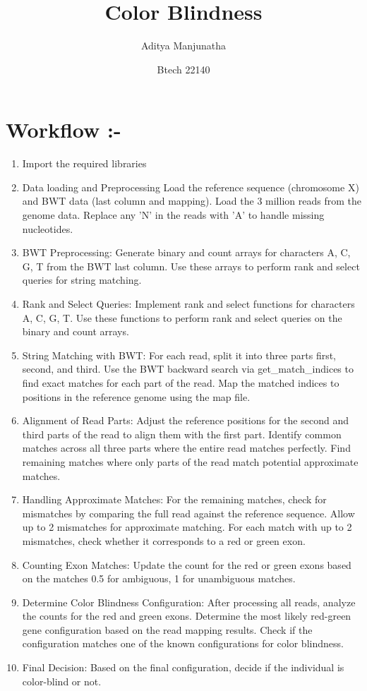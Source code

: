 \documentclass{article}
\title{Color Blindness}
\author{Aditya Manjunatha }
\date{Btech 22140}
\begin{document}
\maketitle

\section*{Workflow :- }
\begin{enumerate}
    \item Import the required libraries
    \item Data loading and Preprocessing
    Load the reference sequence (chromosome X) and BWT data (last column and mapping).
    Load the 3 million reads from the genome data.
    Replace any 'N' in the reads with 'A' to handle missing nucleotides.
    \item BWT Preprocessing:
    Generate binary and count arrays for characters A, C, G, T from the BWT last column.
    Use these arrays to perform rank and select queries for string matching.
    \item Rank and Select Queries:
    Implement rank and select functions for characters A, C, G, T.
    Use these functions to perform rank and select queries on the binary and count arrays.
    \item String Matching with BWT:
    For each read, split it into three parts first, second, and third.
    Use the BWT backward search via get\_match\_indices to find exact matches for each part of the read.
    Map the matched indices to positions in the reference genome using the map file.
    \item  Alignment of Read Parts:
    Adjust the reference positions for the second and third parts of the read to align them with the first part.
    Identify common matches across all three parts where the entire read matches perfectly.
    Find remaining matches where only parts of the read match potential approximate matches.
    \item Handling Approximate Matches:
    For the remaining matches, check for mismatches by comparing the full read against the reference sequence.
    Allow up to 2 mismatches for approximate matching.
    For each match with up to 2 mismatches, check whether it corresponds to a red or green exon.
    \item Counting Exon Matches:
    Update the count for the red or green exons based on the matches 0.5 for ambiguous, 1 for unambiguous matches.
    \item Determine Color Blindness Configuration:
    After processing all reads, analyze the counts for the red and green exons.
    Determine the most likely red-green gene configuration based on the read mapping results.
    Check if the configuration matches one of the known configurations for color blindness.
    \item Final Decision:
    Based on the final configuration, decide if the individual is color-blind or not.
    
\end{enumerate}
\end{document}
